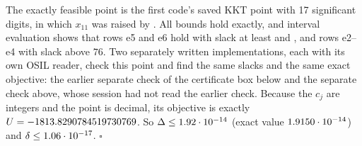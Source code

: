 The exactly feasible point is the first code's saved KKT point with 17 significant digits, in which $x_{11}$ was raised by .
All bounds hold exactly, and interval evaluation shows that rows e5 and e6 hold with slack at least  and , and rows e2--e4 with slack above $76$.
Two separately written implementations, each with its own OSIL reader, check this point and find the same slacks and the same exact objective: the earlier separate check of the certificate box below and the separate check above, whose session had not read the earlier check.
Because the $c_j$ are integers and the point is decimal, its objective is exactly $U=-1813.8290784519730769$.
So $\Delta\le1.92\cdot 10^{-14}$ (exact value $1.9150\cdot 10^{-14}$) and $\delta\le1.06\cdot 10^{-17}$.
\hfill$\square$

\begin{certbox}
\end{certbox}

\subsubsection{}\label{app:small-pindyck}

